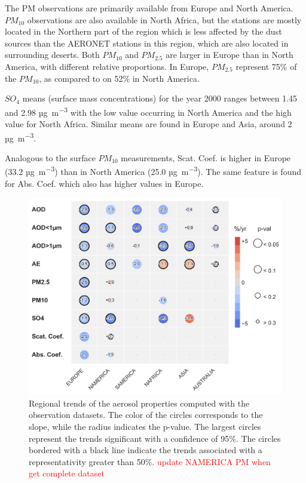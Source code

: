 \documentclass[journal abbreviation, manuscript]{copernicus}
\begin{document}
The PM observations are primarily available from Europe and North America. $PM_{10}$ observations are also available in North Africa, but the stations are mostly located in the Northern part of the region which is less affected by the dust sources than the AERONET stations in this region, which are also located in surrounding deserts. Both $PM_{10}$ and $PM_{2.5}$ are larger in Europe than in North America, with different relative proportions. In Europe, $PM_{2.5}$ represent 75\% of the $PM_{10}$, as compared to on 52\% in North America.

$SO_{4}$ means (surface mass concentrations) for the year 2000 ranges between 1.45 and 2.98 \unit{µg.m^{-3}} with the low value occurring in North America and the high value for North Africa. Similar means are found in Europe and Asia, around 2 \unit{µg.m^{-3}}.

Analogous to the surface $PM_{10}$ measurements, Scat. Coef. is higher in Europe (33.2 \unit{µg.m^{-3}}) than in North America (25.0 \unit{µg.m^{-3}}). The same feature is found for Abs. Coef. which also has higher values in Europe.

\begin{figure}[t]
 \includegraphics[width=12cm]{../scripts/figs/heatmaps/OBS.png}
 \caption{Regional trends of the aerosol properties computed with the observation datasets. The color of the circles corresponds to the slope, while the radius indicates the p-value. The largest circles represent the trends significant with a confidence of 95\%. The circles bordered with a black line indicate the trends associated with a representativity greater than 50\%. \textcolor{red}{update NAMERICA PM when get complete dataset}}
 \label{fig:obs_trends}
\end{figure}
\end{document}
